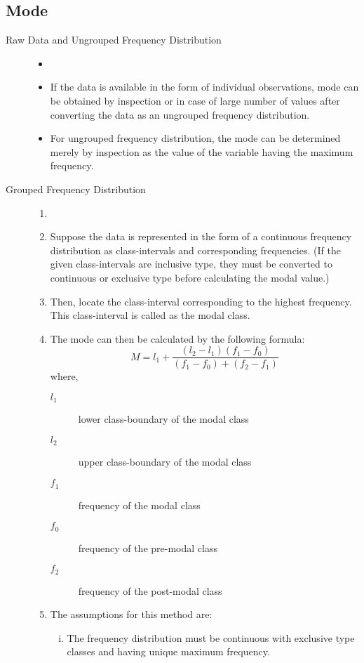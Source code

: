 \documentclass[
10pt, %
a4paper, %
]{report}
\begin{document}
\subsection*{Mode}
\begin{description}
\item[Raw Data and Ungrouped Frequency Distribution]
\begin{itemize}
\item[]
\item If the data is available in the form of individual observations, mode can be obtained by inspection or in case of large number of values after converting the data as an ungrouped frequency distribution.
\item For ungrouped frequency distribution, the mode can be determined merely by inspection as the value of the variable having the maximum frequency.
\end{itemize}
\item[Grouped Frequency Distribution]
\begin{enumerate}[Step 1.]
\item[]
\item Suppose the data is represented in the form of a continuous frequency distribution as class-intervals and corresponding frequencies. (If the given class-intervals are inclusive type, they must be converted to continuous or exclusive type before calculating the modal value.)
\item Then, locate the class-interval corresponding to the highest frequency. This class-interval is called as the modal class.
\item The mode can then be calculated by the following formula:
\[
M = l_1 + \frac{(l_2 - l_1)(f_1 - f_0)}{(f_1-f_0)+(f_2-f_1)}
\]
where,
\begin{description}
\item[\(l_1\)] lower class-boundary of the modal class
\item[\(l_2\)] upper class-boundary of the modal class
\item[\(f_1\)] frequency of the modal class
\item[\(f_0\)] frequency of the pre-modal class
\item[\(f_2\)] frequency of the post-modal class
\end{description}
\item The assumptions for this method are:
\begin{enumerate}[i.]
\item The frequency distribution must be continuous with exclusive type classes and having unique maximum frequency.

\end{enumerate}
\end{enumerate}
\end{description}
\end{document}
